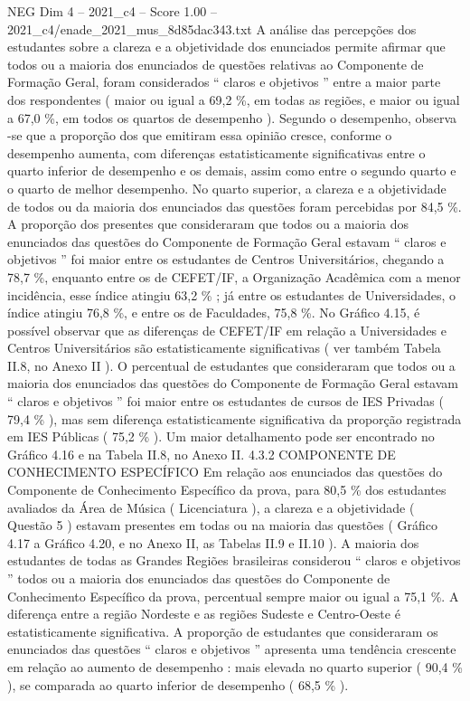 \begin{textsample}{NEG Dim 4 – 2021\_c4 – Score 1.00 – 2021\_c4/enade\_2021\_mus\_8d85dac343.txt}
A análise das percepções dos estudantes sobre a clareza e a objetividade dos enunciados permite afirmar que todos ou a maioria dos enunciados de questões relativas ao Componente de Formação Geral, foram considerados “ claros e objetivos ” entre a maior parte dos respondentes ( maior ou igual a 69,2 \%, em todas as regiões, e maior ou igual a 67,0 \%, em todos os quartos de desempenho ).
Segundo o desempenho, observa -se que a proporção dos que emitiram essa opinião cresce, conforme o desempenho aumenta, com diferenças estatisticamente significativas entre o quarto inferior de desempenho e os demais, assim como entre o segundo quarto e o quarto de melhor desempenho.
No quarto superior, a clareza e a objetividade de todos ou da maioria dos enunciados das questões foram percebidas por 84,5 \%.
A proporção dos presentes que consideraram que todos ou a maioria dos enunciados das questões do Componente de Formação Geral estavam “ claros e objetivos ” foi maior entre os estudantes de Centros Universitários, chegando a 78,7 \%, enquanto entre os de CEFET/IF, a Organização Acadêmica com a menor incidência, esse índice atingiu 63,2 \% ; já entre os estudantes de Universidades, o índice atingiu 76,8 \%, e entre os de Faculdades, 75,8 \%.
No Gráfico 4.15, é possível observar que as diferenças de CEFET/IF em relação a Universidades e Centros Universitários são estatisticamente significativas ( ver também Tabela II.8, no Anexo II ).
O percentual de estudantes que consideraram que todos ou a maioria dos enunciados das questões do Componente de Formação Geral estavam “ claros e objetivos ” foi maior entre os estudantes de cursos de IES Privadas ( 79,4 \% ), mas sem diferença estatisticamente significativa da proporção registrada em IES Públicas ( 75,2 \% ).
Um maior detalhamento pode ser encontrado no Gráfico 4.16 e na Tabela II.8, no Anexo II. 4.3.2 COMPONENTE DE CONHECIMENTO ESPECÍFICO Em relação aos enunciados das questões do Componente de Conhecimento Específico da prova, para 80,5 \% dos estudantes avaliados da Área de Música ( Licenciatura ), a clareza e a objetividade ( Questão 5 ) estavam presentes em todas ou na maioria das questões ( Gráfico 4.17 a Gráfico 4.20, e no Anexo II, as Tabelas II.9 e II.10 ).
A maioria dos estudantes de todas as Grandes Regiões brasileiras considerou “ claros e objetivos ” todos ou a maioria dos enunciados das questões do Componente de Conhecimento Específico da prova, percentual sempre maior ou igual a 75,1 \%.
A diferença entre a região Nordeste e as regiões Sudeste e Centro-Oeste é estatisticamente significativa.
A proporção de estudantes que consideraram os enunciados das questões “ claros e objetivos ” apresenta uma tendência crescente em relação ao aumento de desempenho : mais elevada no quarto superior ( 90,4 \% ), se comparada ao quarto inferior de desempenho ( 68,5 \% ).

\end{textsample}
